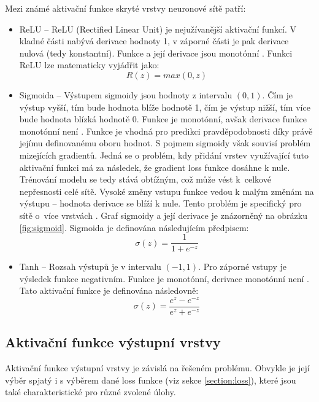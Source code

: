 Mezi známé aktivační funkce skryté vrstvy neuronové sítě patří:
\begin{itemize}
    \item ReLU -- ReLU (Rectified Linear Unit) je nejužívanější aktivační funkcí. V kladné části nabývá derivace hodnoty 1, v záporné části je pak derivace nulová (tedy konstantní). Funkce a její derivace jsou monotónní \cite{ActivationFunctionsInNeuralNetworks}. Funkci ReLU lze matematicky vyjádřit jako:
    \begin{equation} 
    R(z) = max(0, z)
    \end{equation} 
    \item Sigmoida -- Výstupem sigmoidy jsou hodnoty z intervalu $(0, 1)$. Čím je výstup vyšší, tím bude hodnota blíže hodnotě 1, čím je výstup nižší, tím více bude hodnota blízká hodnotě 0. Funkce je monotónní, avšak derivace funkce monotónní není \cite{ActivationFunctionsInNeuralNetworks}. Funkce je vhodná pro predikci pravděpodobnosti díky právě jejímu definovanému oboru hodnot. S pojmem sigmoidy však souvisí problém mizejících gradientů. Jedná se o problém, kdy přidání vrstev využívající tuto aktivační funkci má za následek, že gradient loss funkce dosáhne k nule. Trénování modelu se tedy stává obtížným, což může vést k~celkové nepřesnosti celé sítě. Vysoké změny vstupu funkce vedou k malým změnám na výstupu -- hodnota derivace se blíží k nule. Tento problém je specifický pro sítě o~více vrstvách \cite{VanishingGradientProblem}. Graf sigmoidy a její derivace je znázorněný na obrázku \ref{fig:sigmoid}. Sigmoida je definována následujícím předpisem:
     \begin{equation} 
    \sigma(z) = \frac{1}{1+e^{-z}}
    \end{equation} 
    \item Tanh -- Rozsah výstupů je v intervalu $(-1, 1)$. Pro záporné vstupy je výsledek funkce negativním. Funkce je monotónní, derivace monotónní není \cite{ActivationFunctionsInNeuralNetworks}. Tato aktivační funkce je definována následovně:
       \begin{equation} 
    \sigma(z) = \frac{e^{z}-e^{-z}}{e^{z}+e^{-z}}
    \end{equation} 
\end{itemize}

\subsection{Aktivační funkce výstupní vrstvy}
Aktivační funkce výstupní vrstvy je závislá na řešeném problému. Obvykle je její výběr spjatý i s výběrem dané loss funkce (viz sekce \ref{section:loss}), které jsou také charakteristické pro různé zvolené úlohy.

